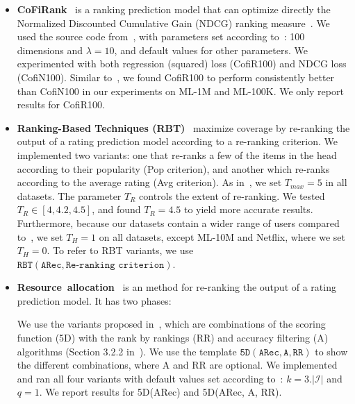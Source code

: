 \begin{itemize}
\item \textbf{CoFiRank}~\cite{weimer2007maximum} is a  ranking prediction model that can optimize directly the  Normalized Discounted Cumulative Gain (NDCG) ranking measure~\cite{voorhees2001overview}.   %
We used the source code from~\cite{weimer2007maximum}, with parameters set according to~\cite{weimer2007maximum}:  100 dimensions and $\lambda =10$, and default values for other parameters. We experimented with both regression (squared) loss (CofiR100) and NDCG loss (CofiN100). 
Similar to~\cite{balakrishnan2012collaborative,volkovs2012collaborative}, we found CofiR100 to perform consistently better than CofiN100 in our experiments on ML-1M and ML-100K. We only report results for CofiR100.  


\item \textbf{Ranking-Based Techniques (RBT)}~\cite{adomavicius2012improving} maximize coverage by re-ranking the output of a rating prediction model according to a re-ranking criterion. We implemented  two variants: one that re-ranks  a few of the items in the head according to their popularity (Pop  criterion), and another which re-ranks according to the  average rating (Avg criterion). As in~\cite{adomavicius2012improving}, we set $T_{max}=5$ in all datasets. The parameter $T_R$ controls the extent of re-ranking. We tested $T_{R}\in [4,4.2,4.5]$, and found $T_R=4.5$ to yield more accurate results. Furthermore, because our datasets contain a wider range of users compared to~\cite{adomavicius2012improving}, we set $T_H=1$ on all datasets, except ML-10M and Netflix, where we set $T_H=0$.  To refer to RBT variants, we  use  $\texttt{RBT}(\texttt{ARec}, \texttt{Re-ranking criterion})$.


\item \textbf{Resource~allocation}~\cite{ho2014likes} 
  is an method for re-ranking the output of a rating prediction model. It has two phases: 
We use the variants  proposed in~\cite{ho2014likes},  which are combinations of the scoring function (5D) with the rank by rankings (RR) and accuracy filtering (A) algorithms (Section 3.2.2 in~\cite{ho2014likes}). We use the template $\texttt{5D} (\texttt{ARec}, \texttt{A}, \texttt{RR})$ to show the different combinations, where A and RR are optional.  
We implemented and ran all four variants  with default values set according to~\cite{ho2014likes}: $k=3.|\mathcal{I}|$ and $q=1$. 
\iffullpaper
\else
We report results for 5D(ARec) and 5D(ARec, A, RR).%
\fi


\end{itemize}
